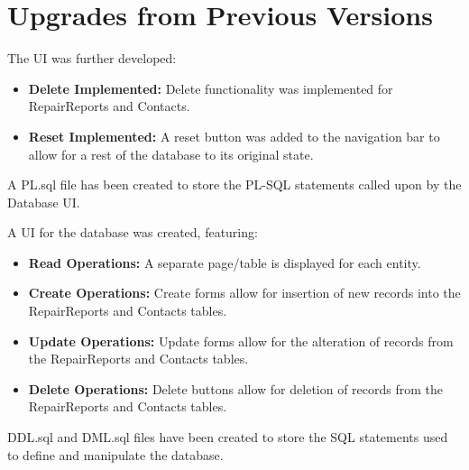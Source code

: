 \documentclass{article}
\begin{document}
\section{Upgrades from Previous Versions}

\vspace{0.5cm}

\begin{tcolorbox}[colback=secondarycolor, colframe=primarycolor, arc=5mm, title=\textbf{Step 3 --> Step 4}]
The UI was further developed:
\vspace{0.2cm}
\begin{itemize}
  \item \textbf{Delete Implemented:} Delete functionality was implemented for RepairReports and Contacts.
  \vspace{0.1cm}
  \item \textbf{Reset Implemented:} A reset button was added to the navigation bar to allow for a rest of the database to its original state.
  \vspace{0.1cm}
  \end{itemize}
\vspace{0.2cm}
A PL.sql file has been created to store the PL-SQL statements called upon by the Database UI.
\end{tcolorbox}

\vspace{1cm}

\begin{tcolorbox}[colback=secondarycolor, colframe=primarycolor, arc=5mm, title=\textbf{Step 2 --> Step 3}]
A UI for the database was created, featuring:
\vspace{0.2cm}
\begin{itemize}
  \item \textbf{Read Operations:} A separate page/table is displayed for each entity.
  \vspace{0.1cm}
  \item \textbf{Create Operations:} Create forms allow for insertion of new records into the RepairReports and Contacts tables.
  \vspace{0.1cm}
  \item \textbf{Update Operations:} Update forms allow for the alteration of records from the RepairReports and Contacts tables.
  \vspace{0.1cm}
  \item \textbf{Delete Operations:} Delete buttons allow for deletion of records from the RepairReports and Contacts tables.
  \end{itemize}
\vspace{0.2cm}
DDL.sql and DML.sql files have been created to store the SQL statements used to define and manipulate the database.
\end{tcolorbox}
\end{document}
